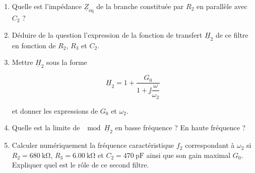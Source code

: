 \documentclass[a4paper,french,bookmarks]{article}
\begin{document}
\begin{enumerate}[resume]
	\item Quelle est l'impédance $\underline{Z}_\text{eq}$ de la branche constituée par $R_2$ en parallèle avec $C_2$ ?
	

	\item Déduire de la question  l'expression de la fonction de transfert $\underline{H}_2$ de ce filtre en fonction de $R_2$, $R_3$ et $C_2$.
	

	\item Mettre $\underline{H}_2$ sous la forme
	
	\begin{equation}
		\underline{H}_2 = 1 + \dfrac{G_0}{1+\jj \dfrac{\omega}{\omega_2}}	
	\end{equation}
	
	et donner les expressions de $G_0$ et $\omega_2$.
	

	\item Quelle est la limite de $\mod{\underline{H}_2}$ en basse fréquence ? En haute fréquence ?
	

	\item Calculer numériquement la fréquence caractéristique $f_2$ correspondant à $\omega_2$ si $R_2 = \SI{680}{\kilo\ohm}$, $R_3 = \SI{6,00}{\kilo\ohm}$ et $C_2 = \SI{470}{\pico\farad}$ ainsi que son gain maximal $G_0$. Expliquer quel est le rôle de ce second filtre.
	

\end{enumerate}
\end{document}

